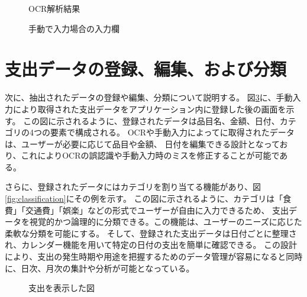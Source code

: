 \documentclass[main]{subfiles}
\begin{document}
\begin{figure}[tb]
    \begin{center}
        \caption{OCR解析結果}
        \label{fig:OCRresult}
    \end{center}
\end{figure}

\begin{figure}[tb]
    \begin{center}
        \caption{手動で入力場合の入力欄}
        \label{fig:input}
    \end{center}
\end{figure}

\section{支出データの登録、編集、および分類}

次に、抽出されたデータの登録や編集、分類について説明する。
図\ref{fig:Registration}に、手動入力により取得された支出データをアプリケーション内に登録した後の画面を示す。
この図に示されるように、登録されたデータは品目名、金額、日付、カテゴリの4つの要素で構成される。
OCRや手動入力によってに取得されたデータは、ユーザーが必要に応じて品目や金額、
日付を編集できる設計となっており、これによりOCRの誤認識や手動入力時のミスを修正することが可能である。

さらに、登録されたデータにはカテゴリを割り当てる機能があり、図\ref{fig:classification}にその例を示す。
この図に示されるように、カテゴリは「食費」「交通費」「娯楽」などの形式でユーザーが自由に入力できるため、
支出データを視覚的かつ論理的に分類できる。この機能は、ユーザーのニーズに応じた柔軟な分類を可能にする。
そして、登録された支出データは日付ごとに整理され、カレンダー機能を用いて特定の日付の支出を簡単に確認できる。
この設計により、支出の発生時期や用途を把握するためのデータ管理が容易になると同時に、日次、月次の集計や分析が可能となっている。

\begin{figure}[tb]
    \begin{center}
        \caption{支出を表示した図}
        \label{fig:Registration}
    \end{center}
\end{figure}
\end{document}
